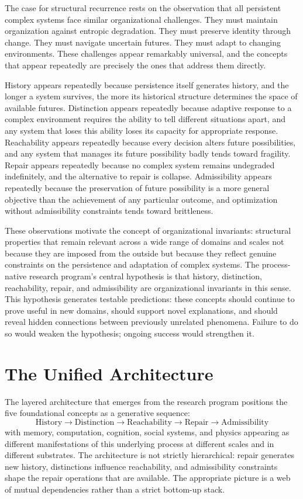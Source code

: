 \documentclass[11pt, oneside]{book}
\theoremstyle{definition}
\theoremstyle{remark}
\begin{document}
The case for structural recurrence rests on the observation that all persistent complex systems face similar organizational challenges. They must maintain organization against entropic degradation. They must preserve identity through change. They must navigate uncertain futures. They must adapt to changing environments. These challenges appear remarkably universal, and the concepts that appear repeatedly are precisely the ones that address them directly.

History appears repeatedly because persistence itself generates history, and the longer a system survives, the more its historical structure determines the space of available futures. Distinction appears repeatedly because adaptive response to a complex environment requires the ability to tell different situations apart, and any system that loses this ability loses its capacity for appropriate response. Reachability appears repeatedly because every decision alters future possibilities, and any system that manages its future possibility badly tends toward fragility. Repair appears repeatedly because no complex system remains undegraded indefinitely, and the alternative to repair is collapse. Admissibility appears repeatedly because the preservation of future possibility is a more general objective than the achievement of any particular outcome, and optimization without admissibility constraints tends toward brittleness.

These observations motivate the concept of organizational invariants: structural properties that remain relevant across a wide range of domains and scales not because they are imposed from the outside but because they reflect genuine constraints on the persistence and adaptation of complex systems. The process-native research program's central hypothesis is that history, distinction, reachability, repair, and admissibility are organizational invariants in this sense. This hypothesis generates testable predictions: these concepts should continue to prove useful in new domains, should support novel explanations, and should reveal hidden connections between previously unrelated phenomena. Failure to do so would weaken the hypothesis; ongoing success would strengthen it.

\section{The Unified Architecture}

The layered architecture that emerges from the research program positions the five foundational concepts as a generative sequence:
\[
\text{History} \to \text{Distinction} \to \text{Reachability} \to \text{Repair} \to \text{Admissibility}
\]
with memory, computation, cognition, social systems, and physics appearing as different manifestations of this underlying process at different scales and in different substrates. The architecture is not strictly hierarchical: repair generates new history, distinctions influence reachability, and admissibility constraints shape the repair operations that are available. The appropriate picture is a web of mutual dependencies rather than a strict bottom-up stack.
\end{document}
